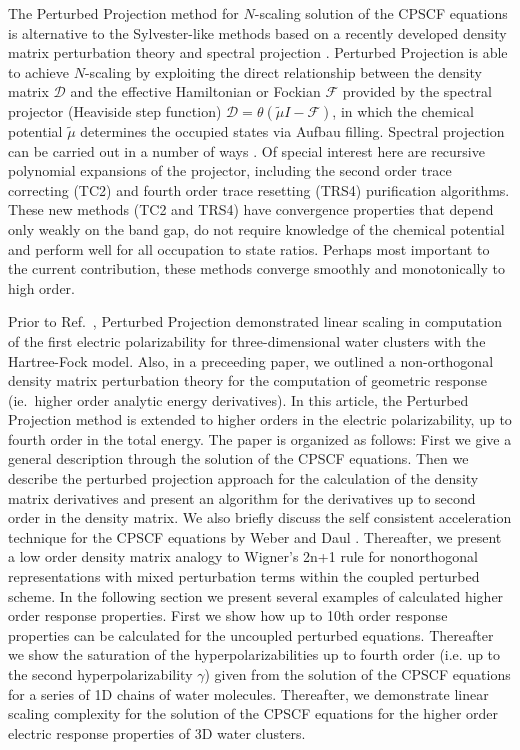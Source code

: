 \documentclass[prl,aps,letterpaper,twocolumn,showpacs,twocolumngrid,superbib]{revtex4}
\begin{document}
The Perturbed Projection method for $N$-scaling solution of the CPSCF equations \cite{Weber04} 
is alternative to the Sylvester-like methods based on a recently developed density matrix perturbation theory 
\cite{ANiklasson04} and spectral projection \cite{ANiklasson02A,ANiklasson03}.   
Perturbed Projection is able to achieve $N$-scaling by exploiting the direct relationship between 
the density matrix $\mathcal{D}$ and the effective Hamiltonian or Fockian $\mathcal{F}$ provided by
the spectral projector (Heaviside step function) $\mathcal{D}=\theta(\tilde{\mu}I-\mathcal{F})$, 
in which the chemical potential $\tilde{\mu}$ determines the occupied states via Aufbau filling.   
Spectral projection can be carried out in a number of ways 
\cite{ANiklasson02A,ANiklasson03,RMcWeeny60,WClinton69,APalser98,GBeylkin99,KNemeth00,AHolas01}.
Of special interest here are recursive polynomial expansions of the projector, including the second 
order trace correcting (TC2) \cite{ANiklasson02A} and fourth order trace resetting (TRS4) 
\cite{ANiklasson03} purification algorithms.  These new methods (TC2 and TRS4) have convergence 
properties that depend only weakly on the band gap, do not require knowledge of the chemical potential 
and perform well for all occupation to state ratios. Perhaps most important to the current contribution, 
these methods converge smoothly and monotonically to high order.      

Prior to Ref.~, Perturbed Projection demonstrated linear scaling in 
computation of the first electric polarizability for three-dimensional water clusters with the 
Hartree-Fock model. Also, in a preceeding paper, we outlined a non-orthogonal density matrix
perturbation theory \cite{} for the computation of geometric response (ie.~higher order analytic 
energy derivatives).  In this article, the Perturbed Projection method is extended to higher orders
in the electric polarizability, up to fourth order in the total energy.  The
 paper is organized as follows: 
 First we give a general description through the solution of the CPSCF equations.
 Then we describe the perturbed projection approach for the calculation
 of the density matrix derivatives and present
 an algorithm for the derivatives up to second order in the density matrix.
 We also briefly discuss the self consistent acceleration technique for the 
 CPSCF equations by Weber and Daul \cite{Weber_2003}.
 Thereafter, we present a low order density matrix analogy to Wigner's 2n+1 rule 
 for nonorthogonal representations with mixed perturbation terms within the
 coupled perturbed scheme.  In the following section we present several examples
 of calculated higher order response properties. First we show how up to 10th
 order response properties can be calculated for the uncoupled perturbed equations.
 Thereafter we show the saturation of the hyperpolarizabilities up to 
 fourth order (i.e. up to the second hyperpolarizability $\gamma$) given from
 the solution of the CPSCF equations for a series of 1D chains of water molecules. 
 Thereafter, we demonstrate linear scaling complexity for the solution of the CPSCF
 equations for the higher order electric response properties of 3D water clusters.
\end{document}
